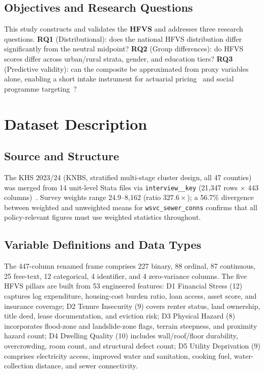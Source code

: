 \documentclass[3p,twocolumn,10pt]{elsarticle}
\begin{document}
\subsection{Objectives and Research Questions}

This study constructs and validates the \textbf{HFVS} and addresses three research
questions. \textbf{RQ1} (Distributional): does the national HFVS distribution differ
significantly from the neutral midpoint? \textbf{RQ2} (Group differences): do HFVS scores
differ across urban/rural strata, gender, and education tiers? \textbf{RQ3} (Predictive
validity): can the composite be approximated from proxy variables alone, enabling a short
intake instrument for actuarial pricing~\cite{abunyewah2022multidimensional} and social
programme targeting~\cite{kimani2023tenure}?

\section{Dataset Description}
\label{sec:data}

\subsection{Source and Structure}

The KHS 2023/24 (KNBS, stratified multi-stage cluster design, all 47 counties) was merged
from 14 unit-level Stata files via \texttt{interview\_\_key} (21,347 rows $\times$ 443
columns)~\cite{knbs2024khs}. Survey weights range 24.9--8,162 (ratio $327.6\times$); a
56.7\% divergence between weighted and unweighted means for \texttt{wsvc\_sewer\_conns}
confirms that all policy-relevant figures must use weighted statistics throughout.

\subsection{Variable Definitions and Data Types}

The 447-column renamed frame comprises 227 binary, 88 ordinal, 87 continuous, 25 free-text,
12 categorical, 4 identifier, and 4 zero-variance columns. The five HFVS pillars are built
from 53 engineered features: D1 Financial Stress (12) captures log expenditure,
housing-cost burden ratio, loan access, asset score, and insurance coverage; D2 Tenure
Insecurity (9) covers renter status, land ownership, title deed, lease documentation, and
eviction risk; D3 Physical Hazard (8) incorporates flood-zone and landslide-zone flags,
terrain steepness, and proximity hazard count; D4 Dwelling Quality (10) includes
wall/roof/floor durability, overcrowding, room count, and structural defect count;
D5 Utility Deprivation (9) comprises electricity access, improved water and sanitation,
cooking fuel, water-collection distance, and sewer connectivity.
\end{document}
